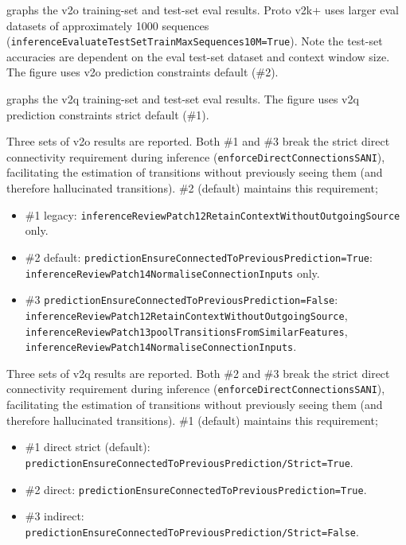  graphs the v2o training-set and test-set eval results. Proto v2k+ uses larger eval datasets of approximately 1000 sequences (\texttt{inferenceEvaluateTestSetTrainMaxSequences10M=True}). Note the test-set accuracies are dependent on the eval test-set dataset and context window size. The figure uses v2o prediction constraints default (\#2).

 graphs the v2q training-set and test-set eval results. The figure uses v2q prediction constraints strict default (\#1).

Three sets of v2o results are reported. Both \#1 and \#3 break the strict direct connectivity requirement during inference (\texttt{enforceDirectConnectionsSANI}), facilitating the estimation of transitions without previously seeing them (and therefore hallucinated transitions). \#2 (default) maintains this requirement;

\begin{itemize}
      \item \#1 legacy: \texttt{inferenceReviewPatch12RetainContextWithoutOutgoingSource} only.
      \item \#2 default: \texttt{predictionEnsureConnectedToPreviousPrediction=True}: \texttt{inferenceReviewPatch14NormaliseConnectionInputs} only.
      \item \#3 \texttt{predictionEnsureConnectedToPreviousPrediction=False}: \texttt{inferenceReviewPatch12RetainContextWithoutOutgoingSource}, \texttt{inferenceReviewPatch13poolTransitionsFromSimilarFeatures}, \texttt{inferenceReviewPatch14NormaliseConnectionInputs}.
\end{itemize}

Three sets of v2q results are reported. Both \#2 and \#3 break the strict direct connectivity requirement during inference (\texttt{enforceDirectConnectionsSANI}), facilitating the estimation of transitions without previously seeing them (and therefore hallucinated transitions). \#1 (default) maintains this requirement;

\begin{itemize}
      \item \#1 direct strict (default): \texttt{predictionEnsureConnectedToPreviousPrediction/Strict=True}.
      \item \#2 direct: \texttt{predictionEnsureConnectedToPreviousPrediction=True}.
      \item \#3 indirect: \texttt{predictionEnsureConnectedToPreviousPrediction/Strict=False}.
\end{itemize}

